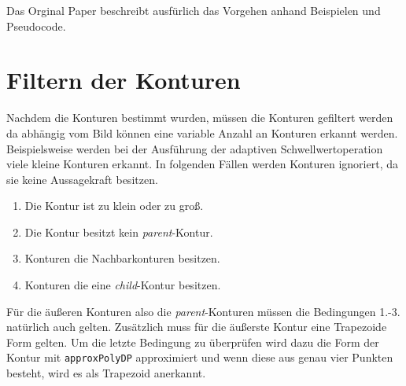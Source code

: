 Das Orginal Paper beschreibt ausfürlich das Vorgehen anhand Beispielen und Pseudocode.

\section{Filtern der Konturen}
Nachdem die Konturen bestimmt wurden, müssen die Konturen gefiltert werden da abhängig vom Bild können eine variable Anzahl an Konturen
erkannt werden. Beispielsweise werden bei der Ausführung der adaptiven Schwellwertoperation viele kleine Konturen erkannt. In folgenden Fällen werden Konturen ignoriert, da sie keine Aussagekraft besitzen.
\begin{enumerate}
	\item Die Kontur ist zu klein oder zu groß.
	\item Die Kontur besitzt kein \emph{parent}-Kontur.
	\item Konturen die Nachbarkonturen besitzen.
	\item Konturen die eine \emph{child}-Kontur besitzen.
\end{enumerate}
Für die äußeren Konturen also die \emph{parent}-Konturen müssen die Bedingungen 1.-3. natürlich auch gelten. Zusätzlich muss für die äußerste Kontur eine Trapezoide Form gelten. Um die letzte Bedingung zu überprüfen wird dazu die Form der Kontur mit \texttt{approxPolyDP} approximiert   und wenn diese aus genau vier Punkten besteht, wird es als Trapezoid anerkannt.

